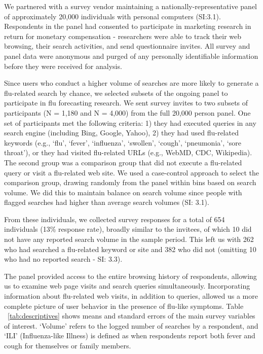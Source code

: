 \documentclass[fleqn,10pt]{wlscirep}
\begin{document}
We partnered with a survey vendor maintaining a nationally-representative panel of approximately 20,000 individuals with personal computers (SI:3.1). Respondents in the panel had consented to participate in marketing research in return for monetary compensation - researchers were able to track their web browsing, their search activities, and send questionnaire invites. All survey and panel data were anonymous and purged of any personally identifiable information before they were received for analysis.

Since users who conduct a higher volume of searches are more likely to generate a flu-related search by chance, we selected subsets of the ongoing panel to participate in flu forecasting research. We sent survey invites to two subsets of participants (N = 1,180 and N = 4,000) from the full 20,000 person panel. One set of participants met the following criteria: 1) they had executed queries in any search engine (including Bing, Google, Yahoo), 2) they had used flu-related keywords (e.g., `flu', `fever', `influenza', `swollen', `cough', `pneumonia', `sore throat'), or they had visited flu-related URLs (e.g., WebMD, CDC, Wikipedia). The second group was a comparison group that did not execute a flu-related query or visit a flu-related web site. We used a case-control approach to select the comparison group, drawing randomly from the panel within bins based on search volume. We did this to maintain balance on search volume since people with flagged searches had higher than average search volumes (SI: 3.1).

From these individuals, we collected survey responses for a total of 654 individuals (13\% response rate), broadly similar to the invitees, of which 10 did not have any reported search volume in the sample period. This left us with 262 who had searched a flu-related keyword or site and 382 who did not (omitting 10 who had no reported search - SI: 3.3).

The panel provided access to the entire browsing history of respondents, allowing us to examine web page visits and search queries simultaneously. Incorporating information about flu-related web visits, in addition to queries, allowed us a more complete picture of user behavior in the presence of flu-like symptoms. Table ~\ref{tab:descriptives} shows means and standard errors of the main survey variables of interest. `Volume' refers to the logged number of searches by a respondent, and `ILI' (Influenza-like Illness) is defined as when respondents report both fever and cough for themselves or family members.
\end{document}
